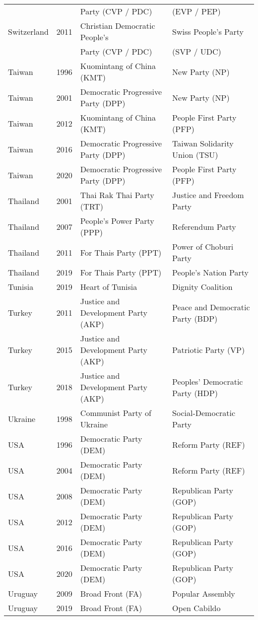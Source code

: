 {\begin{longtable}{|l|c|l|l|}
               &      &        Party (CVP / PDC) &    (EVP / PEP) \\ 
   Switzerland & 2011 &   Christian Democratic People's  &   Swiss People's Party \\ 
               &      &       Party (CVP / PDC)  &     (SVP / UDC) \\ 
   Taiwan & 1996 &   Kuomintang of China (KMT)  &   New Party (NP)   \\ 
   Taiwan & 2001 &   Democratic Progressive Party (DPP) &   New Party (NP)   \\ 
  Taiwan & 2012 &   Kuomintang of China (KMT)  &   People First Party (PFP)   \\ 
  Taiwan & 2016 &   Democratic Progressive Party (DPP) &   Taiwan Solidarity Union (TSU) \\ 
  Taiwan & 2020 &   Democratic Progressive Party (DPP) &   People First Party (PFP)   \\ 
  Thailand & 2001 &   Thai Rak Thai Party (TRT) &   Justice and Freedom Party \\ 
  Thailand & 2007 &   People's Power Party (PPP) &   Referendum Party  \\ 
  Thailand & 2011 &   For Thais Party (PPT) &   Power of Choburi Party \\ 
  Thailand & 2019 &   For Thais Party (PPT) &   People's Nation Party \\ 
  Tunisia & 2019 &   Heart of Tunisia &   Dignity Coalition \\ 
   Turkey & 2011 &   Justice and Development Party (AKP)&   Peace and Democratic Party (BDP)   \\ 
   Turkey & 2015 &   Justice and Development Party (AKP)  &   Patriotic Party (VP) \\ 
  Turkey & 2018 &   Justice and Development Party (AKP) &   Peoples' Democratic Party (HDP)   \\ 
  Ukraine & 1998 &   Communist Party of Ukraine &   Social-Democratic Party \\ 
  USA & 1996 &   Democratic Party (DEM) &   Reform Party (REF) \\ 
    USA& 2004 &   Democratic Party (DEM) &   Reform Party (REF) \\ 
    USA& 2008 &   Democratic Party (DEM) &   Republican Party (GOP) \\ 
    USA & 2012 &   Democratic Party (DEM) &   Republican Party (GOP) \\ 
    USA & 2016 &   Democratic Party (DEM) &   Republican Party (GOP) \\ 
    USA & 2020 &   Democratic Party (DEM) &   Republican Party (GOP) \\ 
   Uruguay & 2009 &   Broad Front (FA) &   Popular Assembly \\ 
   Uruguay & 2019 &   Broad Front (FA) &   Open Cabildo \\ 
  \bottomrule
	\end{longtable} }